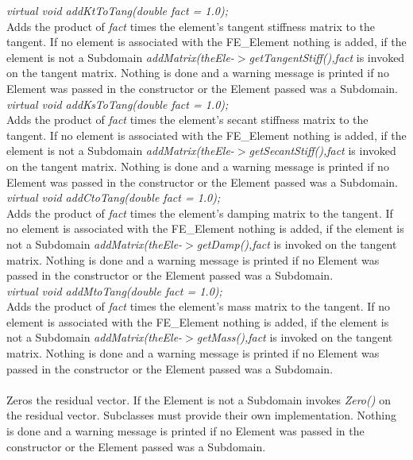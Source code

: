 {\em virtual void addKtToTang(double fact = 1.0); }\\
Adds the product of {\em fact} times the element's tangent stiffness
matrix to the tangent. If no element is associated with the
FE\_Element nothing is added, if the element is not a Subdomain {\em
addMatrix(theEle-$>$getTangentStiff(),fact} is invoked on the tangent
matrix. Nothing is done and a warning message is printed if no Element
was passed in the constructor or the Element passed was a
Subdomain. \\  

{\em virtual void addKsToTang(double fact = 1.0); }\\
Adds the product of {\em fact} times the element's secant stiffness
matrix to the tangent. If no element is associated with the
FE\_Element nothing is added, if the element is not a Subdomain {\em
addMatrix(theEle-$>$getSecantStiff(),fact} is invoked on the tangent
matrix. Nothing is done and a warning message is printed if no Element
was passed in the constructor or the Element passed was a
Subdomain. \\  


{\em virtual void addCtoTang(double fact = 1.0); }\\
Adds the product of {\em fact} times the element's damping
matrix to the tangent. If no element is associated with the
FE\_Element nothing is added, if the element is not a Subdomain 
{\em addMatrix(theEle-$>$getDamp(),fact} is invoked on the tangent
matrix. Nothing is done and a warning message is printed if no Element was
passed in the constructor or the Element passed was a Subdomain. \\  


{\em virtual void addMtoTang(double fact = 1.0); }\\
Adds the product of {\em fact} times the element's mass
matrix to the tangent. If no element is associated with the
FE\_Element nothing is added, if the element is not a Subdomain 
{\em addMatrix(theEle-$>$getMass(),fact} is invoked on the tangent
matrix. Nothing is done and a warning message is printed if no Element was
passed in the constructor or the Element passed was a Subdomain. \\  

 \\
Zeros the residual vector. If the Element is not a Subdomain invokes
{\em Zero()} on the residual vector. Subclasses must provide their own
implementation. Nothing is done and a warning message is printed if no
Element was passed in the constructor or the Element passed was a
Subdomain.\\ 


